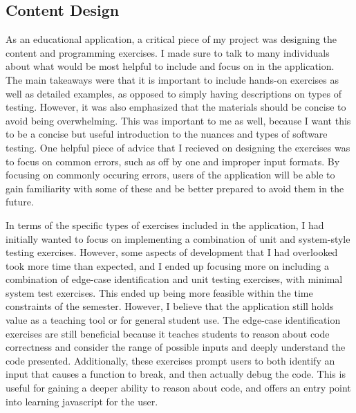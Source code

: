 \documentclass[10pt,twocolumn]{article}
\begin{document}



\subsection{Content Design} 

As an educational application, a critical piece of my project was designing the content and programming exercises.
I made sure to talk to many individuals about what would be most helpful to include and focus on in the application.
The main takeaways were that it is important to include hands-on exercises as well as detailed 
examples, as opposed to simply having descriptions on types of testing. However, it was also emphasized that the materials should be concise to avoid being overwhelming. This was important 
to me as well, because I want this to be a concise but useful introduction to the nuances and types of software testing. 
One helpful piece of advice that I recieved on designing the exercises was to focus on common errors, such as off by one 
and improper input formats. By focusing on commonly occuring errors, users of the application will be able to gain 
familiarity with some of these and be better prepared to avoid them in the future. 

In terms of the specific types of exercises included in the application, I had initially wanted to focus on implementing 
a combination of unit and system-style testing exercises. However, some aspects of development that I had overlooked took 
more time than expected, and I ended up focusing more on including a combination of edge-case identification and unit testing 
exercises, with minimal system test exercises. This ended up being more feasible within the time constraints of the semester. 
However, I believe that the application still holds value as a teaching tool or for general student use. The edge-case 
identification exercises are still beneficial because it teaches students to reason about code correctness and consider 
the range of possible inputs and deeply understand the code presented. Additionally, these exercises prompt users to both 
identify an input that causes a function to break, and then actually debug the code. This is useful for gaining a deeper 
ability to reason about code, and offers an entry point into learning javascript for the user. 
\end{document}
